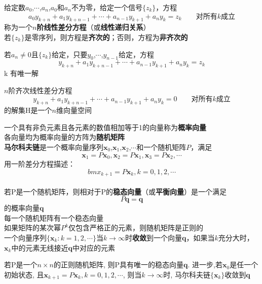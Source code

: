给定数$a_0$,$\cdots$,$a_n$,$a_0$和$a_n$不为零，给定一个信号$\{z_k\}$，方程
\[a_0y_{k+n}+a_1y_{k+n-1}+\cdots+a_{n-1}y_{k+1}+a_ny_k=z_k\qquad\text{对所有}k\text{成立}\]
称为一个\textbf{$n$阶线性差分方程}（或\textbf{线性递归关系}）\\
若$\{z_k\}$是零序列，则方程是\textbf{齐次的}；否则，方程为\textbf{非齐次的}\\[2ex]

\begin{TheoremOne}
若$a_n\neq 0$且$\{z_k\}$给定，只要$y_0$,$\cdots$,$y_{n-1}$给定，方程
\[y_{k+n}+a_1y_{k+n-1}+\cdots+a_{n-1}y_{k+1}+a_ny_k=z_k\]\qquad{}k
有唯一解
\end{TheoremOne}\vspace{4ex}

\begin{TheoremOne}
$n$阶齐次线性差分方程
\[y_{k+n}+a_1y_{k+n-1}+\cdots+a_{n-1}y_{k+1}+a_ny_k=0\qquad\text{对所有}k\text{成立}\]
的解集H是一个$n$维向量空间
\end{TheoremOne}\vspace{4ex}

一个具有非负元素且各元素的数值相加等于1的向量称为\textbf{概率向量}\\[2ex]

各向量均为概率向量的方阵为\textbf{随机矩阵}\\[2ex]

\textbf{马尔科夫链}是一个概率向量序列$\bm{x}_0$,$\bm{x}_1$,$\bm{x}_2$,$\cdots$和一个随机矩阵$P$，满足
\[\bm{x}_1=P\bm{x}_0,\bm{x}_2=P\bm{x}_1,\bm{x}_3=P\bm{x}_2,\cdots\]
用一阶差分方程描述：
\[bm{x}_{k+1}=P\bm{x}_k,k=0,1,2,\cdots\]\\[2ex]

若P是一个随机矩阵，则相对于P的\textbf{稳态向量}（或\textbf{平衡向量}）是一个满足\[P\bm{q=q}\]
的概率向量$\bm{q}$\\
每一个随机矩阵有一个稳态向量\\[2ex]

如果矩阵的某次幂$P^k$仅包含严格正的元素，则随机矩阵是正则的\\[2ex]

一个向量序列$\{\bm{x}_k:k=1,2,\cdots\}$当$k\to\infty$时\textbf{收敛}到一个向量$\bm{q}$，如果当$k$充分大时，$\bm{x}_k$中的元素无线接近$\bm{q}$中对应的元素\\[2ex]

\begin{TheoremOne}
若P是一个$n\times n$的正则随机矩阵, 则P具有唯一的稳态向量$\bm{q}$. 进一步,若$\bm{x}_0$是任一个初始状态, 且$\bm{x}_{k+1}=P\bm{x}_k,k=0,1,2,\cdots$, 则当$k\to\infty$时, 马尔科夫链$\{\bm{x}_k\}$收敛到$\bm{q}$
\end{TheoremOne}
